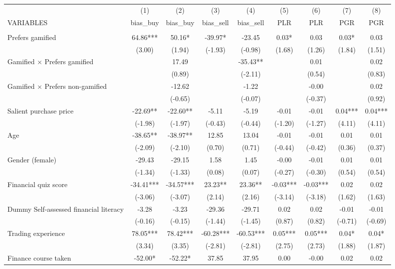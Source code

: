 \documentclass[]{article}
\begin{document}
\begin{tabular}{lcccccccc} \hline
 & (1) & (2) & (3) & (4) & (5) & (6) & (7) & (8) \\
VARIABLES & bias\_buy & bias\_buy & bias\_sell & bias\_sell & PLR & PLR & PGR & PGR \\ \hline
 &  &  &  &  &  &  &  &  \\
Prefers gamified & 64.86*** & 50.16* & -39.97* & -23.45 & 0.03* & 0.03 & 0.03* & 0.03 \\
 & (3.00) & (1.94) & (-1.93) & (-0.98) & (1.68) & (1.26) & (1.84) & (1.51) \\
Gamified $\times$ Prefers gamified &  & 17.49 &  & -35.43** &  & 0.01 &  & 0.02 \\
 &  & (0.89) &  & (-2.11) &  & (0.54) &  & (0.83) \\
Gamified $\times$ Prefers non-gamified &  & -12.62 &  & -1.22 &  & -0.00 &  & 0.02 \\
 &  & (-0.65) &  & (-0.07) &  & (-0.37) &  & (0.92) \\
Salient purchase price & -22.69** & -22.60** & -5.11 & -5.19 & -0.01 & -0.01 & 0.04*** & 0.04*** \\
 & (-1.98) & (-1.97) & (-0.43) & (-0.44) & (-1.20) & (-1.27) & (4.11) & (4.11) \\
Age & -38.65** & -38.97** & 12.85 & 13.04 & -0.01 & -0.01 & 0.01 & 0.01 \\
 & (-2.09) & (-2.10) & (0.70) & (0.71) & (-0.44) & (-0.42) & (0.36) & (0.37) \\
Gender (female) & -29.43 & -29.15 & 1.58 & 1.45 & -0.00 & -0.01 & 0.01 & 0.01 \\
 & (-1.34) & (-1.33) & (0.08) & (0.07) & (-0.27) & (-0.30) & (0.54) & (0.54) \\
Financial quiz score & -34.41*** & -34.57*** & 23.23** & 23.36** & -0.03*** & -0.03*** & 0.02 & 0.02 \\
 & (-3.06) & (-3.07) & (2.14) & (2.16) & (-3.14) & (-3.18) & (1.62) & (1.63) \\
Dummy Self-assessed financial literacy & -3.28 & -3.23 & -29.36 & -29.71 & 0.02 & 0.02 & -0.01 & -0.01 \\
 & (-0.16) & (-0.15) & (-1.44) & (-1.45) & (0.87) & (0.82) & (-0.71) & (-0.69) \\
Trading experience & 78.05*** & 78.42*** & -60.28*** & -60.53*** & 0.05*** & 0.05*** & 0.04* & 0.04* \\
 & (3.34) & (3.35) & (-2.81) & (-2.81) & (2.75) & (2.73) & (1.88) & (1.87) \\
Finance course taken & -52.00* & -52.22* & 37.85 & 37.95 & 0.00 & -0.00 & 0.02 & 0.02 \\

\end{tabular}
\end{document}
